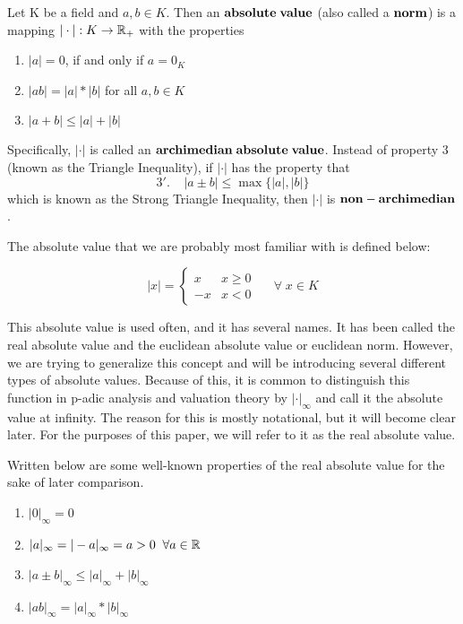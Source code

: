 \documentclass[a4paper]{article}
\begin{document}
\begin{definition}
  Let K be a field and \(a,b\in K\).  Then an 
  \(\bf{absolute\;value}\) (also called a $\bf{norm}$) is a mapping 
  \(|\cdot|:K\to\mathbb R_+\) with the properties
  \begin{enumerate}
    \item \(|a|=0\), if and only if \(a=0_K\)
    \item \(|ab|=|a|*|b|\) for all \(a,b\in K\)
    \item \(|a+b|\leq |a|+|b|\)
  \end{enumerate}
  Specifically, $|\cdot|$ is called an 
  \(\bf{archimedian\;absolute\;value}\).
  Instead of property 3 (known as the Triangle Inequality), if 
  \(|\cdot|\) has the property that 
  \[
  	3'.\;\;\;\; |a\pm b|\leq\max\{|a|,|b|\}
  \]
  which is known as the Strong Triangle Inequality, then 
  \(|\cdot|\) is \(\bf{non-archimedian}\).
\end{definition}

The absolute value that we are probably most familiar with is defined 
below:

\[
  |x|=
  \begin{cases} 
      x & x\geq 0 \\
      -x & x<0 
   \end{cases}\;\;\;\;\;
   \forall\;x\in K
\]

This absolute value is used often, and it has several names.  It has been
called the real absolute value and the euclidean absolute value or euclidean
norm.  However, we are trying to generalize this concept and
will be introducing several different types of absolute values.  Because
of this, it is common to distinguish this function in p-adic analysis and
valuation theory by \(|\cdot|_\infty\) and call it the absolute value at
infinity.  The reason for this is mostly notational, but it will become clear
later.  For the purposes of this paper, we will refer to it as the real
absolute value.

\begin{properties}
Written below are some well-known properties of the real absolute value for the
sake of later comparison.
  \begin{enumerate}
    \item \(|0|_\infty=0\)
    \item \(|a|_\infty=|-a|_\infty=a>0\;\;\forall a\in\mathbb R\)
    \item \(|a\pm b|_\infty\leq |a|_\infty+|b|_\infty\)
    \item \(|ab|_\infty=|a|_\infty*|b|_\infty\)
  \end{enumerate}
\end{properties}
\end{document}
